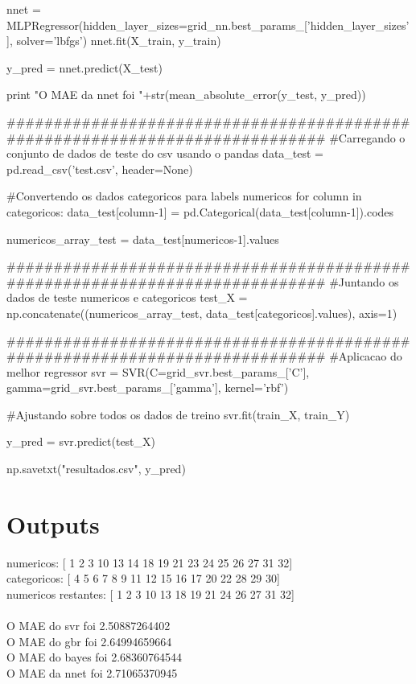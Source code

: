 \documentclass{article}
\begin{document}
\begin{python}
nnet = MLPRegressor(hidden_layer_sizes=grid_nn.best_params_['hidden_layer_sizes'],
	 solver='lbfgs')
nnet.fit(X_train, y_train)

y_pred = nnet.predict(X_test)

print "O MAE da nnet foi "+str(mean_absolute_error(y_test, y_pred))

#############################################################################
#Carregando o conjunto de dados de teste do csv usando o pandas
data_test = pd.read_csv('test.csv', header=None)

#Convertendo os dados categoricos para labels numericos
for column in categoricos:
	data_test[column-1] = pd.Categorical(data_test[column-1]).codes

numericos_array_test = data_test[numericos-1].values

#############################################################################
#Juntando os dados de teste numericos e categoricos
test_X = np.concatenate((numericos_array_test, data_test[categoricos].values), axis=1)

#############################################################################
#Aplicacao do melhor regressor 
svr = SVR(C=grid_svr.best_params_['C'], gamma=grid_svr.best_params_['gamma'], kernel='rbf')

#Ajustando sobre todos os dados de treino
svr.fit(train_X, train_Y)

y_pred = svr.predict(test_X)

np.savetxt("resultados.csv", y_pred)
\end{python}

\newpage

\section{Outputs}
\begin{tcolorbox}
numericos: [ 1  2  3 10 13 14 18 19 21 23 24 25 26 27 31 32] \\
categoricos: [ 4  5  6  7  8  9 11 12 15 16 17 20 22 28 29 30] \\
numericos restantes: [ 1  2  3 10 13 18 19 21 24 26 27 31 32] \\
\\
O MAE do svr foi 2.50887264402 \\
O MAE do gbr foi 2.64994659664 \\
O MAE do bayes foi 2.68360764544 \\
O MAE da nnet foi 2.71065370945
\end{tcolorbox}
\end{document}
